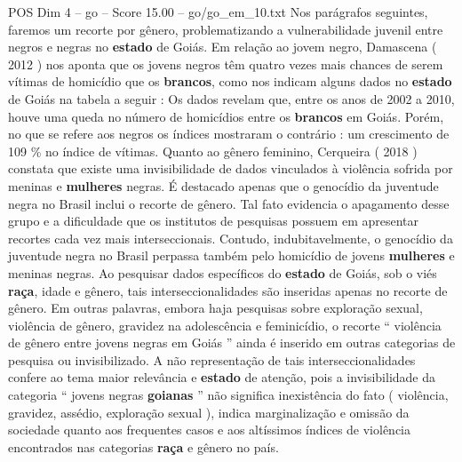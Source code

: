 \begin{textsample}{POS Dim 4 – go – Score 15.00 – go/go\_em\_10.txt}
Nos parágrafos seguintes, faremos um recorte por gênero, problematizando a vulnerabilidade juvenil entre negros e negras no \textbf{estado} de Goiás.
Em relação ao jovem negro, Damascena ( 2012 ) nos aponta que os jovens negros têm quatro vezes mais chances de serem vítimas de homicídio que os \textbf{brancos}, como nos indicam alguns dados no \textbf{estado} de Goiás na tabela a seguir : Os dados revelam que, entre os anos de 2002 a 2010, houve uma queda no número de homicídios entre os \textbf{brancos} em Goiás.
Porém, no que se refere aos negros os índices mostraram o contrário : um crescimento de 109 \% no índice de vítimas.
Quanto ao gênero feminino, Cerqueira ( 2018 ) constata que existe uma invisibilidade de dados vinculados à violência sofrida por meninas e \textbf{mulheres} negras.
É destacado apenas que o genocídio da juventude negra no Brasil inclui o recorte de gênero.
Tal fato evidencia o apagamento desse grupo e a dificuldade que os institutos de pesquisas possuem em apresentar recortes cada vez mais interseccionais.
Contudo, indubitavelmente, o genocídio da juventude negra no Brasil perpassa também pelo homicídio de jovens \textbf{mulheres} e meninas negras.
Ao pesquisar dados específicos do \textbf{estado} de Goiás, sob o viés \textbf{raça}, idade e gênero, tais interseccionalidades são inseridas apenas no recorte de gênero.
Em outras palavras, embora haja pesquisas sobre exploração sexual, violência de gênero, gravidez na adolescência e feminicídio, o recorte “ violência de gênero entre jovens negras em Goiás ” ainda é inserido em outras categorias de pesquisa ou invisibilizado.
A não representação de tais interseccionalidades confere ao tema maior relevância e \textbf{estado} de atenção, pois a invisibilidade da categoria “ jovens negras \textbf{goianas} ” não significa inexistência do fato ( violência, gravidez, assédio, exploração sexual ), indica marginalização e omissão da sociedade quanto aos frequentes casos e aos altíssimos índices de violência encontrados nas categorias \textbf{raça} e gênero no país.

\end{textsample}
